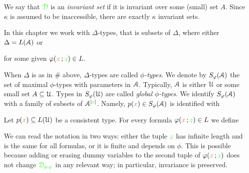 \documentclass[creche.tex]{subfiles}
\begin{document}
We say that ${\color{green}\EuScript D}$ is an \emph{invariant set\/} if it is invariant over some (small) set $A$.
Since  $\kappa$ is assumed to be inaccessible, there are exactly $\kappa$ invariant sets.

In this chapter we work with $\Delta$-types, that is subsets of $\Delta$, where either  $\Delta=L(\EuScript A)$ or 


for some given $\varphi({\color{brown} x}\,;{\color{green} z})\in L$.

\begin{definition} 
  When $\Delta$ is as in $\#$ above, $\Delta$-types are called \emph{$\phi$-types}.
  We denote by \emph{$S_\varphi(\EuScript A)$\/} the set of maximal $\phi$-types with parameters in $\EuScript A$.
  Typically, $\EuScript A$ is either $\EuScript U$ or some small set $A\subseteq\EuScript U$.
  Types in \emph{$S_{\varphi}(\EuScript U)$\/} are called \emph{global $\phi$-types}.
  We identify $S_\varphi(\EuScript A)$ with a family of subsets of $\EuScript A^{|{\color{green} z}|}$.
  Namely, $p({\color{brown} x})\in S_\varphi(\EuScript A)$ is identified with
   
  \QED
\end{definition}

% 

Let $p({\color{brown} x})\subseteq L(\EuScript U)$ be a consistent type.
For every formula $\varphi({\color{brown} x}\,;{\color{green} z})\in L$ we define


We can read the notation in two ways: either the tuple ${\color{green} z}$ has infinite length and is the same for all formulas, or it is finite and depends on $\phi$.
This is possible because adding or erasing dummy variables to the second tuple of $\varphi({\color{brown} x}\,;{\color{green} z})$ does not change ${\color{green}\EuScript D_{p,\varphi}}$ in any relevant way; in particular, invariance is preserved.
\end{document}

